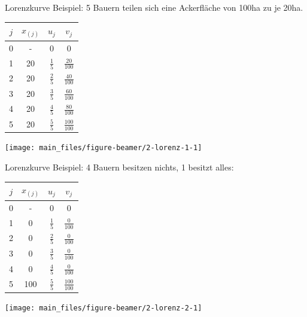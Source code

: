 \documentclass[
  10pt,
  ignorenonframetext,
]{beamer}
\begin{document}
\begin{frame}{Lorenzkurve}
\label{lorenzkurve-3}
Beispiel: 5 Bauern teilen sich eine Ackerfläche von 100ha zu je 20ha.

\columnsbegin
\column{5cm}
          \renewcommand{\arraystretch}{1.35}
          \begin{tabular}{cccc}
              $j$ &  $x_{(j)}$  &   $u_{j}$   &  $v_{j}$ \\
              \hline
              0       &   -                   &   0   &   0\\
              1       &   20              &   $\frac{1}{5}$    &   $\frac{20}{100}$ \\
              2       &   20              &   $\frac{2}{5}$    &   $\frac{40}{100}$ \\
              3       &   20              &   $\frac{3}{5}$    &   $\frac{60}{100}$ \\
              4       &   20              &   $\frac{4}{5}$    &   $\frac{80}{100}$ \\
              5       &   20              &   $\frac{5}{5}$    &   $\frac{100}{100}$ \\
          \end{tabular}
\column{6cm}
\scriptsize

\begin{center}\texttt{[image: main\_files/figure-beamer/2-lorenz-1-1]} \end{center}

\normalsize
\columnsend
\end{frame}

\begin{frame}{Lorenzkurve}
\label{lorenzkurve-4}
Beispiel: 4 Bauern besitzen nichts, 1 besitzt alles: \columnsbegin
\column{5cm} \renewcommand{\arraystretch}{1.35}

\begin{tabular}{cccc}
              $j$ &  $x_{(j)}$  &   $u_{j}$   &  $v_{j}$ \\
              \hline
              0       &   -                   &   0   &   0\\
              1       &   0              &   $\frac{1}{5}$    &   $\frac{0}{100}$ \\
              2       &   0              &   $\frac{2}{5}$    &   $\frac{0}{100}$ \\
              3       &   0              &   $\frac{3}{5}$    &   $\frac{0}{100}$ \\
              4       &   0              &   $\frac{4}{5}$    &   $\frac{0}{100}$ \\
              5       &   100              &   $\frac{5}{5}$    &   $\frac{100}{100}$ \\
          \end{tabular}
\column{6cm}
\scriptsize

\begin{center}\texttt{[image: main\_files/figure-beamer/2-lorenz-2-1]} \end{center}

\normalsize
\columnsend
\end{frame}
\end{document}
